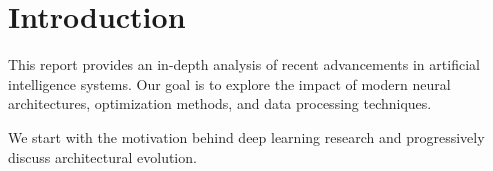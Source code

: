 \chapter{Introduction}\label{ch:introduction}
This report provides an in-depth analysis of recent advancements in artificial intelligence systems.
Our goal is to explore the impact of modern neural architectures, optimization methods, and data processing techniques.

We start with the motivation behind deep learning research and progressively discuss architectural evolution.
